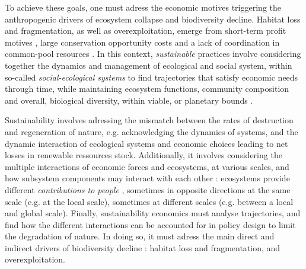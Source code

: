 To achieve these goals, one must adress the economic motives triggering the 
anthropogenic drivers of ecosystem collapse and biodiversity decline. Habitat loss and fragmentation, as well as overexploitation, emerge from short-term profit motives \citep{clark_profit_1973}, large conservation opportunity costs \citep{swanson_economics_1994} and a lack of coordination in common-pool resources \citep{Gordon1954, smith_models_1969}. In this context, \textit{sustainable} practices involve considering together the dynamics and management of ecological and social system, within so-called \textit{social-ecological systems} \citep{Ostrom2009} to find trajectories that satisfy economic needs through time, while maintaining ecosystem functions, community composition and overall, biological diversity, within viable, or planetary bounds \citep{Dasgupta2007, steffen_2015_planetary}. 

	Sustainability involves adressing the mismatch between the rates of destruction and regeneration of nature, e.g. acknowledging the dynamics of systems, and the dynamic interaction of ecological systems and economic choices leading to net losses in renewable ressources stock. Additionally, it involves considering the multiple interactions of economic forces and ecosystems, at various scales, and how subsystem components may interact with each other : ecosystems provide different \textit{contributions to people} \citep{DIAZ20151, ipbes_2022_6417333}, sometimes in opposite directions at the same scale (e.g. at the local scale), sometimes at different scales (e.g. between a local and global scale). Finally, sustainability economics must analyse trajectories, and find how the different interactions can be accounted for in policy design to limit the degradation of nature. In doing so, it must adress the main direct and indirect drivers of biodiversity decline : habitat loss and fragmentation, and overexploitation. 
	

